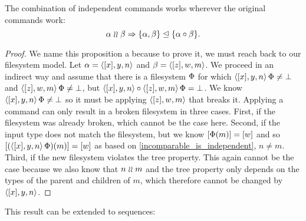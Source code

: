 \begin{myax}\label{combine_independent_commands}
The combination of independent commands works wherever the original commands work:
\[ \alpha\mathrel{\wr\wr} \beta \Rightarrow {\{\alpha, \beta\}}\trianglelefteq{\{\alpha\circ\beta\}}. \]
\end{myax}
\begin{proof}
We name this proposition a  
because to prove it, we must reach back to our filesystem model.
Let $\alpha=\langle{[x],y,n}\rangle$ and $\beta=\langle{[z],w,m}\rangle$.
We proceed in an indirect way and
assume that there is a filesystem $\Phi$ for which
$\langle{[x],y,n}\rangle\,\Phi\neq\bot$ and $\langle{[z],w,m}\rangle\,\Phi\neq\bot$, but
$\langle{[x],y,n}\rangle\circ \langle{[z],w,m}\rangle\,\Phi=\bot$.
We know $\langle{[x],y,n}\rangle\,\Phi\neq\bot$ so it must be applying 
$\langle{[z],w,m}\rangle$ that breaks it.
Applying a command can only result in a broken filesystem in three cases.
First, if the filesystem was already broken, which cannot be the case here.
Second, if the input type does not match the filesystem,
but we know $[\Phi(m)]=[w]$ and so
$[(\langle{[x],y,n}\rangle\,\Phi)(m)]=[w]$ as based on \cref{incomparable_is_independent}, $n\neq m$.
Third, if the new filesystem violates the tree property.
This again cannot be the case because we also know that $n\mathrel{\wr\wr} m$
and the tree property only depends on the types of the parent and children of $m$,
which therefore cannot be changed by $\langle{[x],y,n}\rangle$.
\end{proof}

This result can be extended to sequences:

